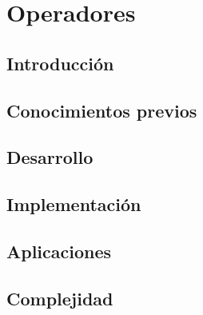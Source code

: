 \chapter{Operadores}
\section{Introducción}

\section{Conocimientos previos}

\section{Desarrollo}

\section{Implementación}

\section{Aplicaciones}

\section{Complejidad}

%